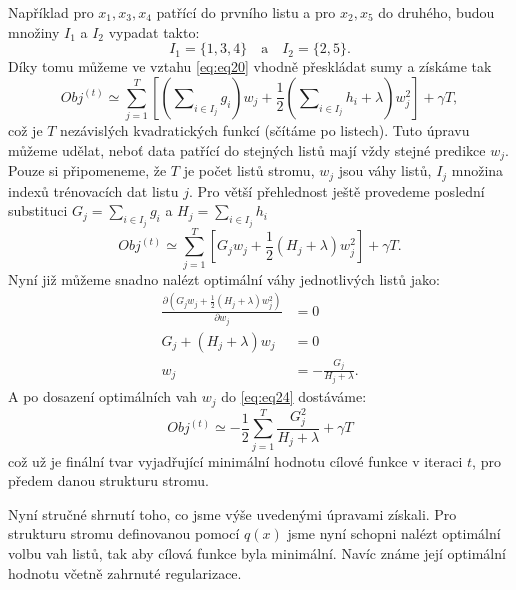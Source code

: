 \documentclass[a4paper]{article}
\begin{document}
Například pro $x_1, x_3, x_4$ patřící do prvního listu a pro $x_2, x_5$ do druhého, budou množiny $I_1$ a $I_2$ vypadat takto:
    \begin{equation}
        I_1 = \{1,3,4\} \quad \text{a} \quad I_2 = \{2,5\}.
    \end{equation}
Díky tomu můžeme ve vztahu \eqref{eq:eq20} vhodně přeskládat sumy a získáme tak
    \begin{equation}\label{eq:eq23}
        Obj^{(t)} \simeq \sum\limits_{j=1}^T \left[ \left( \sum \nolimits_{i \in I_j} g_i \right) w_j + \frac{1}{2} \left(\sum \nolimits_{i \in I_j} h_i + \lambda \right) w_j^2 \right] 
        + \gamma T,
    \end{equation}
což je $T$ nezávislých kvadratických funkcí (sčítáme po listech). Tuto úpravu můžeme udělat, neboť data patřící do stejných listů mají vždy stejné predikce $w_j$. Pouze si připomeneme, že $T$ je počet listů stromu, $w_j$ jsou váhy listů, $I_j$ množina indexů trénovacích dat listu $j$. Pro větší přehlednost ještě provedeme poslední substituci $G_j = \sum \nolimits_{i \in I_j} g_i$ a $H_j = \sum \nolimits_{i \in I_j} h_i$
    \begin{equation}\label{eq:eq24}
        Obj^{(t)} \simeq \sum\limits_{j=1}^T \left[G_j w_j + \frac{1}{2} (H_j + \lambda ) w_j^2 \right] + \gamma T.
    \end{equation}
Nyní již můžeme snadno nalézt optimální váhy jednotlivých listů jako:
    \begin{equation}
        \begin{aligned}
            \frac{\partial (G_j w_j + \frac{1}{2}(H_j + \lambda)w_j^2)}{\partial w_j} &= 0 \\
            G_j + (H_j + \lambda)w_j &= 0 \\
            w_j &= -\frac{G_j}{H_j + \lambda}.
        \end{aligned}
    \end{equation}
A po dosazení optimálních vah $w_j$ do \eqref{eq:eq24} dostáváme:
    \begin{equation}
        Obj^{(t)} \simeq -\frac{1}{2} \sum\limits_{j=1}^T \frac{G_j^2}{H_j + \lambda} + \gamma T
    \end{equation}
což už je finální tvar vyjadřující minimální hodnotu cílové funkce v iteraci $t$, pro předem danou strukturu stromu. 

Nyní stručné shrnutí toho, co jsme výše uvedenými úpravami získali. Pro strukturu stromu definovanou pomocí $q(x)$ jsme nyní schopni nalézt optimální volbu vah listů, tak aby cílová funkce byla minimální. Navíc známe její optimální hodnotu včetně zahrnuté regularizace. 
\end{document}
